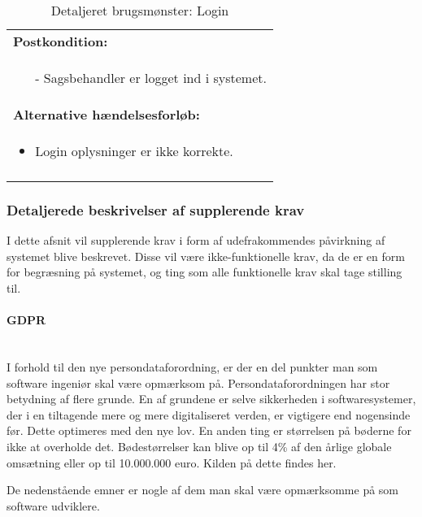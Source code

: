 \documentclass[../../main.tex]{subfiles}
\begin{document}
\begin{center}
\begin{longtable}{| p{}|}
\textbf{Postkondition:} \\
  \begin{minipage}[t]{\textwidth}
    \begin{itemize}
    \item[-] Sagsbehandler er logget ind i systemet.
    \end{itemize}
  \end{minipage} \\ \hline

\textbf{Alternative hændelsesforløb:} \\
  \begin{minipage}[t]{\textwidth}
    \begin{itemize}
    \item Login oplysninger er ikke korrekte.
    \end{itemize}
  \end{minipage} \\ \hline
  \caption{Detaljeret brugsmønster: Login}
 \label{db:0001}
\end{longtable}
\end{center}

\subsubsection{Detaljerede beskrivelser af supplerende krav}
I dette afsnit vil supplerende krav i form af udefrakommendes påvirkning af systemet blive beskrevet. Disse vil være ikke-funktionelle krav, da de er en form for begræsning på systemet, og ting som alle funktionelle krav skal tage stilling til.

\paragraph{GDPR}\mbox{} \\
I forhold til den nye persondataforordning, er der en del punkter man som software ingeniør skal være opmærksom på. Persondataforordningen har stor betydning af flere grunde. En af grundene er selve sikkerheden i softwaresystemer, der i en tiltagende mere og mere digitaliseret verden, er vigtigere end nogensinde før. Dette optimeres med den nye lov. En anden ting er størrelsen på bøderne for ikke at overholde det. Bødestørrelser kan blive op til 4\% af den årlige globale omsætning eller op til 10.000.000 euro. Kilden på dette findes her. \cite{gdpr}

De nedenstående emner er nogle af dem man skal være opmærksomme på som software udviklere.
\end{document}
